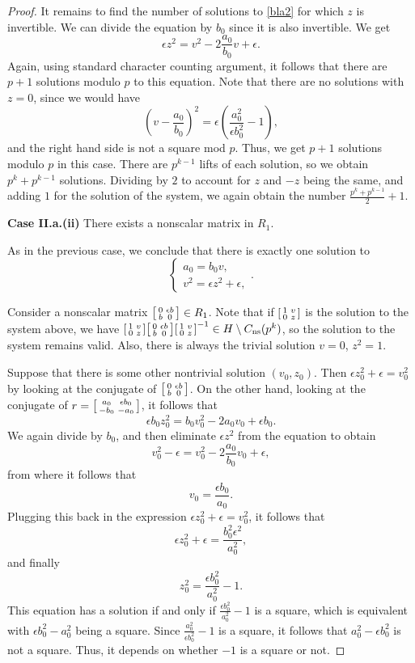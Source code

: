 \documentclass[10pt,a4paper]{amsart}
\newcommand\sm[1]{\begin{bsmallmatrix}#1\end{bsmallmatrix}}
\begin{document}
\begin{proof}
It remains to find the number of solutions to \eqref{bla2} for which $z$ is invertible. We can divide the equation by $b_0$ since it is also invertible. We get $$\epsilon z^2=v^2-2\frac{a_0}{b_0}v+\epsilon.$$
Again, using standard character counting argument, it follows that there are $p+1$ solutions modulo $p$ to this equation. Note that there are no solutions with $z=0$, since we would have $$\left(v-\frac{a_0}{b_0} \right)^2=\epsilon\left(\frac{a_0^2}{\epsilon b_0^2}-1\right),$$ and the right hand side is not a square mod $p$. Thus, we get $p+1$ solutions modulo $p$ in this case. There are $p^{k-1}$ lifts of each solution, so we obtain $p^k+p^{k-1}$ solutions.  Dividing by $2$ to account for $z$ and $-z$ being the same, and adding $1$ for the solution of the system, we again obtain the number $\frac{p^k+p^{k-1}}{2}+1$.

\noindent \textbf{Case II.a.(ii)} There exists a nonscalar matrix in $R_1$.

As in the previous case, we conclude that there is exactly one solution to $$\begin{cases}
a_0=b_0v, \\
v^2=\epsilon z^2+\epsilon,
\end{cases}.$$

Consider a nonscalar matrix $\sm{0 & \epsilon b \\ b & 0} \in R_1$. Note that if $\sm{1 & v \\0 & z}$ is the solution to the system above, we have $\sm{1 & v \\0 & z }\sm{0 & \epsilon b \\ b & 0}\sm{1 & v \\ 0 & z}^{-1}\in H\setminus C_{\mathrm{ns}}(p^k)$, so the solution to the system remains valid. Also, there is always the trivial solution $v=0$, $z^2=1$. 

Suppose that there is some other nontrivial solution $(v_0, z_0)$. Then $\epsilon z_0^2+\epsilon= v_0^2$ by looking at the conjugate of $\sm{0 & \epsilon b \\ b & 0 }$. On the other hand, looking at the conjugate of $r=\sm{a_0 & \epsilon b_0 \\ -b_0 & -a_0}$, it follows that $$\epsilon b_0 z_0^2=b_0 v_0^2-2a_0v_0+\epsilon b_0.$$ We again divide by $b_0$, and then eliminate $\epsilon z^2$ from the equation to obtain $$v_0^2-\epsilon=v_0^2-2\frac{a_0}{b_0}v_0+\epsilon,$$ from where it follows that $$v_0=\frac{\epsilon b_0}{a_0}.$$
Plugging this back in the expression $\epsilon z_0^2+\epsilon=v_0^2$, it follows that $$\epsilon z_0^2+\epsilon=\frac{b_0^2\epsilon^2}{a_0^2},$$ and finally $$z_0^2=\frac{\epsilon b_0^2}{a_0^2}-1.$$
This equation has a solution if and only if $\frac{\epsilon b_0^2}{a_0^2}-1$ is a square, which is equivalent with $\epsilon b_0^2-a_0^2$ being a square. Since $\frac{a_0^2}{\epsilon b_0^2}-1$ is a square, it follows that $a_0^2-\epsilon b_0^2$ is not a square. Thus, it depends on whether $-1$ is a square or not. 


\end{proof}
\end{document}
